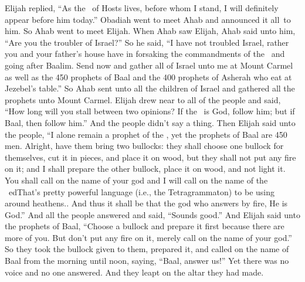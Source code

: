 \begin{inparaenum}
   Elijah replied, ``As the \lord\ of Hosts lives, before whom I stand, I will definitely appear before him today.''%
   Obadiah went to meet Ahab and announced it all\understood\ to him. So Ahab went to meet Elijah.%
   When Ahab saw Elijah, Ahab said unto him, ``Are you the troubler of Israel?''%
   So he said, ``I have not troubled Israel, rather you and your father's house have in forsaking the commandments of the \lord\ and going after Baalim.%
   Send now and gather all of Israel unto me at Mount Carmel as well as the 450 prophets of Baal and the 400 prophets of Asherah who eat at Jezebel's table.''%
   So Ahab sent unto all the children of Israel and gathered all the prophets unto Mount Carmel.%
   Elijah drew near to all of the people and said, ``How long will you stall between two opinions? If the \lord\ is God, follow him; but if Baal, then follow him.'' And the people didn't say a thing.%
   Then Elijah said unto the people, ``I alone remain a prophet of the \lord, yet the prophets of Baal are 450 men.%
   Alright, have them bring two bullocks: they shall choose one bullock for themselves, cut it in pieces, and place it on wood, but they shall not put any fire on it; and I shall prepare the other bullock, place it on wood, and not light it.%
   You shall call on the name of your god and I will call on the name of the \lord\ ed{That's pretty powerful language (i.e., the Tetragrammaton) to be using around heathens.}. And thus it shall be that the god who answers by fire, He is God.'' And all the people answered and said, ``Sounds good.''%
   And Elijah said unto the prophets of Baal, ``Choose a bullock and prepare it first because there are more of you. But don't put any fire on it, merely call on the name of your god.''%
   So they took the bullock given to them, prepared it, and called on the name of Baal from the morning until noon, saying, ``Baal, answer us!'' Yet there was no voice and no one answered. And they leapt on the altar they had made.%

\end{inparaenum}
